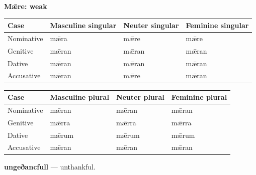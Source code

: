 \textbf{Mǣre: weak}

\par\begingroup
\fontsize{10.5}{13.2}\selectfont
\setlength{\LTleft}{0pt}\setlength{\LTright}{\fill}
\noindent
\begin{tabular}{@{}>{\raggedright\arraybackslash}p{22.0mm}>{\raggedright\arraybackslash}p{31.188mm}>{\raggedright\arraybackslash}p{31.188mm}>{\raggedright\arraybackslash}p{31.188mm}@{}}
\toprule
\textbf{Case} & \textbf{Masculine singular} & \textbf{Neuter singular} & \textbf{Feminine singular} \\
\midrule
Nominative & mǣra & mǣre & mǣre \\
Genitive & mǣran & mǣran & mǣran \\
Dative & mǣran & mǣran & mǣran \\
Accusative & mǣran & mǣre & mǣran \\
\bottomrule
\end{tabular}
\par\endgroup
\par\addvspace{5pt}
\par\begingroup
\fontsize{10.5}{13.2}\selectfont
\setlength{\LTleft}{0pt}\setlength{\LTright}{\fill}
\noindent
\begin{tabular}{@{}>{\raggedright\arraybackslash}p{22.0mm}>{\raggedright\arraybackslash}p{31.188mm}>{\raggedright\arraybackslash}p{31.188mm}>{\raggedright\arraybackslash}p{31.188mm}@{}}
\toprule
\textbf{Case} & \textbf{Masculine plural} & \textbf{Neuter plural} & \textbf{Feminine plural} \\
\midrule
Nominative & mǣran & mǣran & mǣran \\
Genitive & mǣrra & mǣrra & mǣrra \\
Dative & mǣrum & mǣrum & mǣrum \\
Accusative & mǣran & mǣran & mǣran \\
\bottomrule
\end{tabular}
\par\endgroup

\textbf{ungeðancfull} — unthankful.

